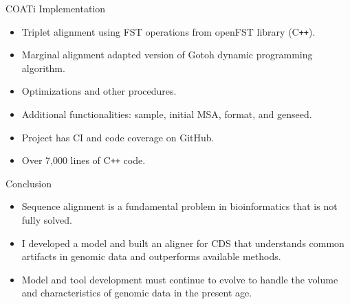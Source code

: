 \documentclass[aspectratio=169,font=14pt]{beamer}
\newcommand{\cyan}[1]{\textcolor{cyan}{#1}}
\begin{document}
\begin{frame}{COATi Implementation} %
    \begin{itemize}
	\setlength\itemsep{1em}
        \item Triplet alignment using FST operations from openFST library (C\texttt{++}).
        \item Marginal alignment adapted version of Gotoh dynamic programming algorithm.
        \item Optimizations and other procedures.
        \item Additional functionalities: sample, initial MSA, format, and genseed.
        \item Project has CI and code coverage on GitHub.
        \item Over 7,000 lines of C\texttt{++} code.
    \end{itemize}
\end{frame} %

\begin{frame}{Conclusion} %
\begin{itemize}
    \setlength\itemsep{1em}
    \item Sequence alignment is a fundamental problem in bioinformatics that is not fully solved.
    \item I developed a model and built an aligner for CDS that understands common artifacts in genomic data and outperforms available methods.
    \item Model and tool development must continue to evolve to handle the volume and characteristics of genomic data in the present age.
\end{itemize}
\end{frame} %
\end{document}
